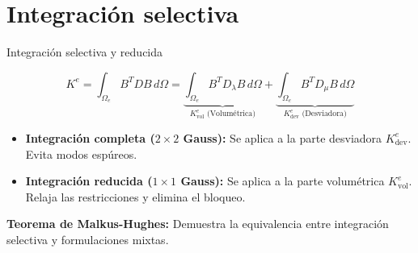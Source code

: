 \documentclass[10pt, aspectratio=43]{beamer}
\begin{document}
\section[Integración]{Integración selectiva}
\begin{frame}{Integración selectiva y reducida}
  \begin{uicard}[title=Descomposición de la matriz de rigidez elemental $K^e$, top=3pt, bottom=4pt, left=8pt, right=8pt, attach title to upper={\par\vspace{0.08cm}}]
    \small
    $$K^e = \int_{\Omega_e} B^T D B \, d\Omega = \underbrace{\int_{\Omega_e} B^T D_{\lambda} B \, d\Omega}_{K_{\text{vol}}^e \text{ (Volumétrica)}} + \underbrace{\int_{\Omega_e} B^T D_{\mu} B \, d\Omega}_{K_{\text{dev}}^e \text{ (Desviadora)}}$$
  \end{uicard}

  \vspace{0.15cm}

  \begin{uicard}[title=Regla de integración Gaussiana, top=3pt, bottom=4pt, left=8pt, right=8pt, attach title to upper={\par\vspace{0.08cm}}]
    \small
    \begin{itemize}
      \item \textbf{Integración completa ($2 \times 2$ Gauss):} Se aplica a la parte desviadora $K_{\text{dev}}^e$. Evita modos espúreos.
      \item \textbf{Integración reducida ($1 \times 1$ Gauss):} Se aplica a la parte volumétrica $K_{\text{vol}}^e$. Relaja las restricciones y elimina el bloqueo.
    \end{itemize}
    \par\vspace{0.05cm}
    \centering
    \textcolor{TextDark!70}{\footnotesize \textbf{Teorema de Malkus-Hughes:} Demuestra la equivalencia entre integración selectiva y formulaciones mixtas.}
  \end{uicard}
\end{frame}
\end{document}
